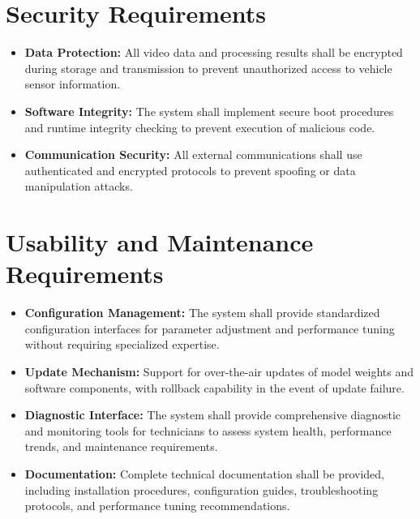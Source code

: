 \section{Security Requirements}

\begin{itemize}
    \item \textbf{Data Protection:} All video data and processing results shall be encrypted during storage and transmission to prevent unauthorized access to vehicle sensor information.
    
    \item \textbf{Software Integrity:} The system shall implement secure boot procedures and runtime integrity checking to prevent execution of malicious code.
    
    \item \textbf{Communication Security:} All external communications shall use authenticated and encrypted protocols to prevent spoofing or data manipulation attacks.
\end{itemize}

\section{Usability and Maintenance Requirements}

\begin{itemize}
    \item \textbf{Configuration Management:} The system shall provide standardized configuration interfaces for parameter adjustment and performance tuning without requiring specialized expertise.
    
    \item \textbf{Update Mechanism:} Support for over-the-air updates of model weights and software components, with rollback capability in the event of update failure.
    
    \item \textbf{Diagnostic Interface:} The system shall provide comprehensive diagnostic and monitoring tools for technicians to assess system health, performance trends, and maintenance requirements.
    
    \item \textbf{Documentation:} Complete technical documentation shall be provided, including installation procedures, configuration guides, troubleshooting protocols, and performance tuning recommendations.
\end{itemize}

